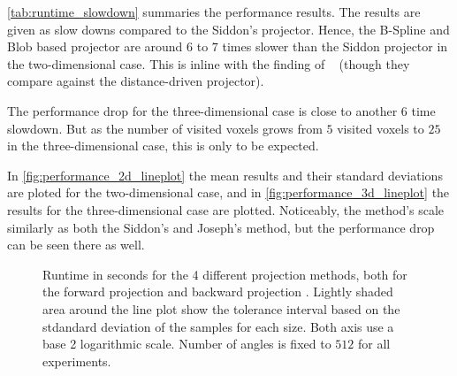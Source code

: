 \autoref{tab:runtime_slowdown} summaries the performance results. The results are given as slow
downs compared to the Siddon's projector. Hence, the B-Spline and Blob based projector are around
\(6\) to \(7\) times slower than the Siddon projector in the two-dimensional case. This is inline
with the finding of \citeauthor*{momey_b-spline_2012}~\cite{momey_b-spline_2012} (though they
compare against the distance-driven projector).

The performance drop for the three-dimensional case is close to another \(6\) time slowdown. But as
the number of visited voxels grows from \(5\) visited voxels to \(25\) in the three-dimensional
case, this is only to be expected.

In \autoref{fig:performance_2d_lineplot} the mean results and their standard deviations are ploted
for the two-dimensional case, and in \autoref{fig:performance_3d_lineplot} the results for the
three-dimensional case are plotted. Noticeably, the method's scale similarly as both the Siddon's
and Joseph's method, but the performance drop can be seen there as well.

\begin{figure}[h]
	\centering


	\caption{Runtime in seconds for the 4 different projection methods, both for the forward
		projection  and backward
		projection . Lightly shaded area around
		the line plot show the tolerance interval based on the stdandard deviation of the
		samples for each size. Both axis use a base 2 logarithmic scale. Number of angles is
		fixed to \(512\) for all experiments.}%
	\label{fig:performance_2d_lineplot}
\end{figure}

